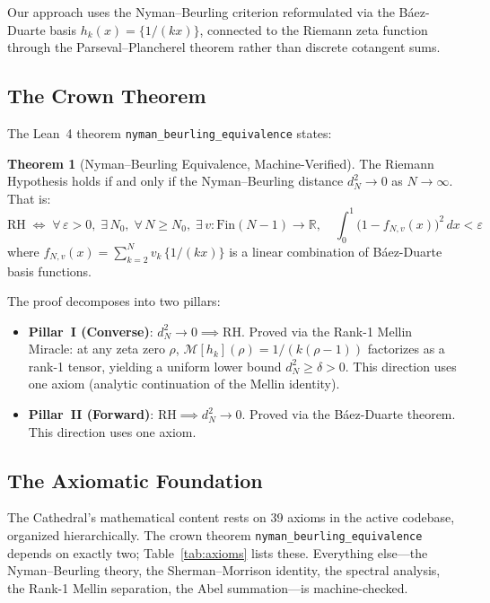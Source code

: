 \documentclass[11pt,a4paper]{article}
\theoremstyle{definition}
\newtheorem{theorem}[definition]{Theorem}
\newcommand{\RH}{\mathrm{RH}}
\newcommand{\RR}{\mathbb{R}}
\newcommand{\lean}[1]{\texttt{#1}}
\begin{document}
Our approach uses the Nyman--Beurling criterion \cite{nyman1950,beurling1955}
reformulated via the B\'aez-Duarte basis \cite{baezduarte2003}
$h_k(x) = \{1/(kx)\}$, connected to the Riemann zeta function through the
Parseval--Plancherel theorem rather than discrete cotangent sums.

\subsection{The Crown Theorem}

The Lean~4 theorem \lean{nyman\_beurling\_equivalence} states:
\begin{theorem}[Nyman--Beurling Equivalence, Machine-Verified]
\label{thm:crown}
The Riemann Hypothesis holds if and only if the Nyman--Beurling distance
$d_N^2 \to 0$ as $N \to \infty$. That is:
\[
  \RH \;\iff\;
  \forall\,\varepsilon > 0,\;\exists\,N_0,\;\forall\,N \geq N_0,\;
  \exists\,v : \mathrm{Fin}(N-1) \to \RR,\quad
  \int_0^1 \bigl(1 - f_{N,v}(x)\bigr)^2\,dx < \varepsilon
\]
where $f_{N,v}(x) = \sum_{k=2}^{N} v_k\,\{1/(kx)\}$ is a linear combination
of B\'aez-Duarte basis functions.
\end{theorem}

The proof decomposes into two pillars:
\begin{itemize}
  \item \textbf{Pillar~I (Converse)}: $d_N^2 \to 0 \implies \RH$.
    Proved via the Rank-1 Mellin Miracle: at any zeta zero $\rho$,
    $\mathcal{M}[h_k](\rho) = 1/(k(\rho-1))$ factorizes as a rank-1
    tensor, yielding a uniform lower bound $d_N^2 \geq \delta > 0$.
    This direction uses one axiom (analytic continuation of the Mellin identity).
  \item \textbf{Pillar~II (Forward)}: $\RH \implies d_N^2 \to 0$.
    Proved via the B\'aez-Duarte theorem. This direction uses one axiom.
\end{itemize}

\subsection{The Axiomatic Foundation}

The Cathedral's mathematical content rests on 39 axioms in the active
codebase, organized hierarchically. The crown theorem
\lean{nyman\_beurling\_equivalence} depends on exactly two;
Table~\ref{tab:axioms} lists these. Everything else---the Nyman--Beurling
theory, the Sherman--Morrison identity, the spectral analysis, the
Rank-1 Mellin separation, the Abel summation---is machine-checked.
\end{document}
